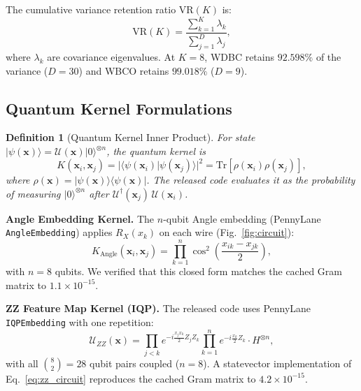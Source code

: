 \documentclass[journal,twocolumn]{IEEEtran}
\newtheorem{definition}{Definition}
\begin{document}
The cumulative variance retention ratio $\text{VR}(K)$ is:
\begin{equation}
    \text{VR}(K) = \frac{\sum_{k=1}^{K} \lambda_k}{\sum_{j=1}^{D} \lambda_j},
    \label{eq:pca_var}
\end{equation}
where $\lambda_k$ are covariance eigenvalues. At $K=8$, WDBC retains $92.598\%$ of the variance ($D=30$) and WBCO retains $99.018\%$ ($D=9$).

\subsection{Quantum Kernel Formulations}

\begin{definition}[Quantum Kernel Inner Product]
For state $|\psi(\mathbf{x})\rangle = \mathcal{U}(\mathbf{x})|0\rangle^{\otimes n}$, the quantum kernel is
\begin{equation}
    K(\mathbf{x}_i, \mathbf{x}_j) = |\langle\psi(\mathbf{x}_i)|\psi(\mathbf{x}_j)\rangle|^2 = \text{Tr}[\rho(\mathbf{x}_i)\rho(\mathbf{x}_j)],
    \label{eq:qkernel}
\end{equation}
where $\rho(\mathbf{x}) = |\psi(\mathbf{x})\rangle\langle\psi(\mathbf{x})|$. The released code evaluates it as the probability of measuring $|0\rangle^{\otimes n}$ after $\mathcal{U}^\dagger(\mathbf{x}_j)\,\mathcal{U}(\mathbf{x}_i)$.
\end{definition}

\textbf{Angle Embedding Kernel.} The $n$-qubit Angle embedding (PennyLane \texttt{AngleEmbedding}) applies $R_X(x_k)$ on each wire (Fig.~\ref{fig:circuit}):
\begin{equation}
    K_{\text{Angle}}(\mathbf{x}_i, \mathbf{x}_j) = \prod_{k=1}^{n} \cos^2\!\left(\frac{x_{ik} - x_{jk}}{2}\right),
    \label{eq:angle_kernel}
\end{equation}
with $n=8$ qubits. We verified that this closed form matches the cached Gram matrix to $1.1\times10^{-15}$.

\textbf{ZZ Feature Map Kernel (IQP).} The released code uses PennyLane \texttt{IQPEmbedding} with one repetition:
\begin{equation}
    \mathcal{U}_{ZZ}(\mathbf{x}) = \prod_{j<k} e^{-i\frac{x_j x_k}{2} Z_j Z_k} \prod_{k=1}^{n} e^{-i\frac{x_k}{2} Z_k} \cdot H^{\otimes n},
    \label{eq:zz_circuit}
\end{equation}
with all $\binom{8}{2}=28$ qubit pairs coupled ($n=8$). A statevector implementation of Eq.~\eqref{eq:zz_circuit} reproduces the cached Gram matrix to $4.2\times10^{-15}$.
\end{document}
